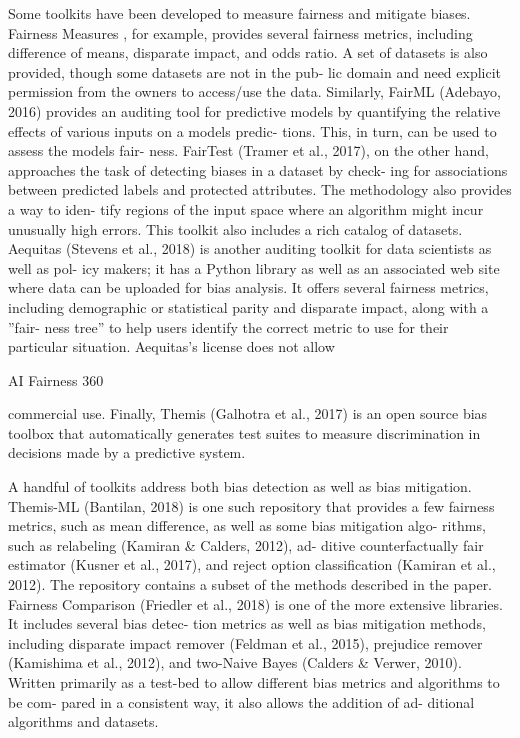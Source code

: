\documentclass[sigconf,review]{acmart}
\begin{document}
Some toolkits have been developed to measure fairness and mitigate biases. 
Fairness Measures \cite{zehlike2017fairness}, for example, provides several fairness metrics, including difference of
means, disparate impact, and odds ratio. 
A set of datasets is also provided, though some datasets are not in the pub-
lic domain and need explicit permission from the owners
to access/use the data. 
Similarly, FairML (Adebayo, 2016) provides an auditing tool for predictive models by quantifying the relative effects of various inputs on a models predic-
tions. 
This, in turn, can be used to assess the models fair-
ness. FairTest (Tramer et al., 2017), on the other hand, approaches the task of detecting biases in a dataset by check-
ing for associations between predicted labels and protected
attributes. The methodology also provides a way to iden-
tify regions of the input space where an algorithm might
incur unusually high errors. This toolkit also includes a
rich catalog of datasets. Aequitas (Stevens et al., 2018) is
another auditing toolkit for data scientists as well as pol-
icy makers; it has a Python library as well as an associated
web site where data can be uploaded for bias analysis. It
offers several fairness metrics, including demographic or
statistical parity and disparate impact, along with a ”fair-
ness tree” to help users identify the correct metric to use for
their particular situation. Aequitas’s license does not allow


AI Fairness 360

commercial use. Finally, Themis (Galhotra et al., 2017) is
an open source bias toolbox that automatically generates
test suites to measure discrimination in decisions made by
a predictive system.

A handful of toolkits address both bias detection as well
as bias mitigation. Themis-ML (Bantilan, 2018) is one
such repository that provides a few fairness metrics, such
as mean difference, as well as some bias mitigation algo-
rithms, such as relabeling (Kamiran \& Calders, 2012), ad-
ditive counterfactually fair estimator (Kusner et al., 2017),
and reject option classiﬁcation (Kamiran et al., 2012). The
repository contains a subset of the methods described in the
paper. Fairness Comparison (Friedler et al., 2018) is one of
the more extensive libraries. It includes several bias detec-
tion metrics as well as bias mitigation methods, including
disparate impact remover (Feldman et al., 2015), prejudice
remover (Kamishima et al., 2012), and two-Naive Bayes
(Calders \& Verwer, 2010). Written primarily as a test-bed
to allow different bias metrics and algorithms to be com-
pared in a consistent way, it also allows the addition of ad-
ditional algorithms and datasets.
\end{document}
